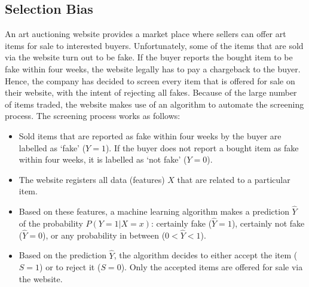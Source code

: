 \subsection{Selection Bias}


An art auctioning website provides a market place where sellers can offer
art items for sale to interested buyers.
Unfortunately, some of the items that are sold via the website turn out to be fake. 
If the buyer reports the bought item to be fake within four weeks, 
the website legally has to pay a chargeback to the buyer.
Hence, the company has decided to screen every item that is offered for sale 
on their website, with the intent of rejecting all fakes.
Because of the large number of items traded, the website makes use of an algorithm
to automate the screening process. The screening process works as follows:
\begin{itemize}
  \item Sold items that are reported as fake within four weeks by the buyer are labelled as `fake' ($Y=1$).
   If the buyer does not report a bought item as fake within four weeks, it is labelled as `not fake' ($Y=0$).
  \item The website registers all data (features) $X$ that are related to a particular item.%
  \item Based on these features, a machine learning algorithm makes a prediction $\hat{Y}$ of the probability $P(Y=1|X=x)$: certainly fake ($\hat{Y}=1$), certainly not fake ($\hat{Y}=0$), or any probability in between ($0 < \hat{Y} < 1$).
  \item Based on the prediction $\hat{Y}$, the algorithm decides to either accept the item ($S=1$) or to reject it ($S=0$). Only the accepted items are offered for sale via the website.
\end{itemize}

